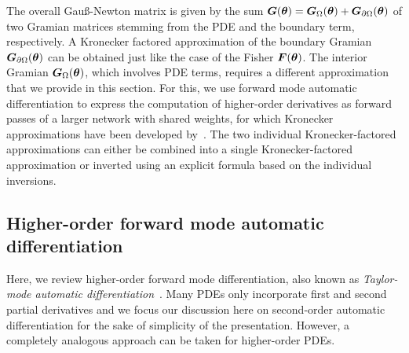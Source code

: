 
The overall Gauß-Newton matrix is given by the sum ${\bm{G}}({\bm{\theta}})= {\bm{G}}_\Omega({\bm{\theta}}) + {\bm{G}}_{\partial\Omega}({\bm{\theta}})$ of two Gramian matrices stemming from the PDE and the boundary term, respectively.
A Kronecker factored approximation of the boundary Gramian ${\bm{G}}_{\partial\Omega}({\bm{\theta}})$ can be obtained just like the case of the  Fisher ${\bm{F}}({\bm{\theta}})$.
The interior Gramian ${\bm{G}}_\Omega({\bm{\theta}})$, which involves PDE terms, requires a different approximation that we provide in this section.
For this, we use forward mode automatic differentiation to express the computation of higher-order derivatives as forward passes of a larger network with shared weights, for which Kronecker approximations have been developed by~\citet{eschenhagen2023kroneckerfactored}.
The two individual Kronecker-factored approximations can either be combined into a single Kronecker-factored approximation or inverted using an explicit formula based on the individual inversions.

\subsection{Higher-order forward mode automatic differentiation}
\label{sec:taylor-mode-AD}

Here, we review higher-order forward mode differentiation, also known as \emph{Taylor-mode automatic differentiation}~\citep{griewank1996algorithm, griewank2008evaluating, bettencourt2019taylor}.
Many PDEs only incorporate first and second partial derivatives and we focus our discussion here on second-order automatic differentiation for the sake of simplicity of the presentation.
However, a completely analogous approach can be taken for higher-order PDEs.

